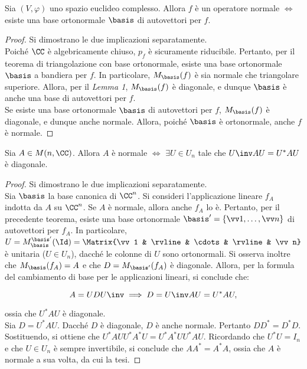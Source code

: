 \documentclass[11pt]{article}
\begin{document}
	\begin{theorem}
		Sia $(V, \varphi)$ uno spazio euclideo complesso. Allora $f$ è un operatore normale $\iff$ esiste
		una base ortonormale $\basis$ di autovettori per $f$.
	\end{theorem}
	
	\begin{proof} Si dimostrano le due implicazioni separatamente. \\
		
		\rightproof Poiché $\CC$ è algebricamente chiuso, $p_f$ è sicuramente riducibile. Pertanto,
		per il teorema di triangolazione con base ortonormale, esiste una base ortonormale $\basis$
		a bandiera per $f$. In particolare, $M_\basis(f)$ è sia normale che triangolare superiore.
		Allora, per il \textit{Lemma 1}, $M_\basis(f)$ è diagonale, e dunque $\basis$ è anche una
		base di autovettori per $f$. \\
		
		\leftproof Se esiste una base ortonormale $\basis$ di autovettori per $f$, $M_\basis(f)$ è
		diagonale, e dunque anche normale. Allora, poiché $\basis$ è ortonormale, anche $f$
		è normale.
	\end{proof}
	
	\begin{corollary}
		Sia $A \in M(n, \CC)$. Allora $A$ è normale $\iff$ $\exists U \in U_n$ tale che $U\inv A U = U^* A U$
		è diagonale.
	\end{corollary}
	
	\begin{proof} Si dimostrano le due implicazioni separatamente. \\
		
		\rightproof Sia $\basis$ la base canonica di $\CC^n$.
		Si consideri l'applicazione lineare $f_A$ indotta da $A$ su $\CC^n$. Se $A$ è normale, allora
		anche $f_A$ lo è. Pertanto, per il precedente teorema, esiste una base ortonormale $\basis' = \{ \vv 1, \ldots, \vv n \}$ di
		autovettori per $f_A$. In particolare, $U = M_{\basis}^{\basis'}(\Id) = \Matrix{\vv 1 & \rvline & \cdots & \rvline & \vv n}$ è unitaria ($U \in U_n$), dacché le colonne di $U$ sono ortonormali. Si osserva inoltre che
		$M_{\basis}(f_A) = A$ e che $D = M_{\basis'}(f_A)$ è diagonale. Allora, per la formula del cambiamento di base per le applicazioni lineari,
		si conclude che:
		
		\[ A = U D U\inv \implies D = U\inv A U = U^* A U, \]
		
		ossia che $U^* A U$ è diagonale. \\
		
		\leftproof Sia $D = U^* A U$. Dacché $D$ è diagonale, $D$ è anche normale. Pertanto $D D^* = D^* D$.
		Sostituendo, si ottiene che $U^* A U U^* A^* U = U^* A^* U U^* A U$. Ricordando che $U^* U = I_n$ e
		che $U \in U_n$ è sempre invertibile, si conclude che $A A^* = A^* A$, ossia che $A$ è normale a
		sua volta, da cui la tesi. 
	\end{proof}
\end{document}
